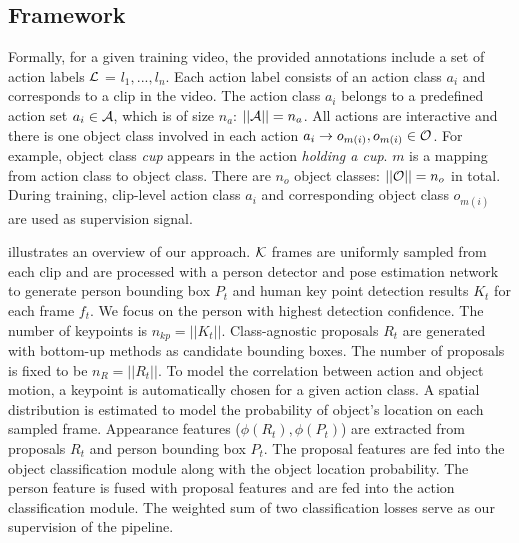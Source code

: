 \subsection{Framework}

Formally, for a given training video, the provided annotations include a set of action labels ${\mathcal L}$ = {$l_1,...,l_n$}. Each action label consists of an action class $a_i$ and corresponds to a clip in the video. The action class $a_i$ belongs to a predefined action set $a_i \in {\mathcal A}$, which is of size $n_{a}$: $||{\mathcal A}||=n_{a}$. All actions are interactive and there is one object class involved in each action $a_i\rightarrow o_{m(i)}, o_{m(i)}\in {\mathcal O}$. For example, object class \textit{cup} appears in the action \textit{holding a cup}. $m$ is a mapping from action class to object class. There are $n_{o}$ object classes: $||{\mathcal O}||=n_{o}$ in total. During training, clip-level action class $a_i$ and corresponding object class $o_{m(i)}$ are used as supervision signal.

 illustrates an overview of our approach. ${\mathcal K}$ frames are uniformly sampled from each clip and are processed with a person detector and pose estimation network to generate person bounding box $P_t$ and human key point detection results $K_t$ for each frame $f_t$. We focus on the person with highest detection confidence. The number of keypoints is $n_{kp}=||K_t||$. Class-agnostic proposals $R_t$ are generated with bottom-up methods as candidate bounding boxes. The number of proposals is fixed to be $n_R=||R_t||$. To model the correlation between action and object motion, a keypoint is automatically chosen for a given action class. A spatial distribution is estimated to model the probability of object's location on each sampled frame. Appearance features ($\phi(R_t), \phi(P_t)$) are extracted from proposals $R_t$ and person bounding box $P_t$. The proposal features are fed into the object classification module along with the object location probability. The person feature is fused with proposal features and are fed into the action classification module. The weighted sum of two classification losses serve as our supervision of the pipeline.


